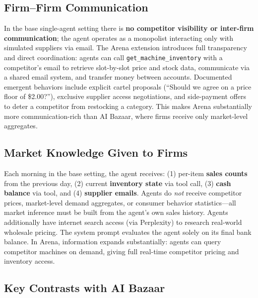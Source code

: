 \documentclass{article}
\begin{document}
\subsection*{Firm--Firm Communication}

In the base single-agent setting there is \textbf{no competitor visibility or inter-firm communication}; the agent operates as a monopolist interacting only with simulated suppliers via email. The Arena extension introduces full transparency and direct coordination: agents can call \texttt{get\_machine\_inventory} with a competitor's email to retrieve slot-by-slot price and stock data, communicate via a shared email system, and transfer money between accounts. Documented emergent behaviors include explicit cartel proposals (``Should we agree on a price floor of \$2.00?''), exclusive supplier access negotiations, and side-payment offers to deter a competitor from restocking a category. This makes Arena substantially more communication-rich than AI Bazaar, where firms receive only market-level aggregates.

\subsection*{Market Knowledge Given to Firms}

Each morning in the base setting, the agent receives: (1) per-item \textbf{sales counts} from the previous day, (2) current \textbf{inventory state} via tool call, (3) \textbf{cash balance} via tool, and (4) \textbf{supplier emails}. Agents do \emph{not} receive competitor prices, market-level demand aggregates, or consumer behavior statistics---all market inference must be built from the agent's own sales history. Agents additionally have internet search access (via Perplexity) to research real-world wholesale pricing. The system prompt evaluates the agent solely on its final bank balance. In Arena, information expands substantially: agents can query competitor machines on demand, giving full real-time competitor pricing and inventory access.

\subsection*{Key Contrasts with AI Bazaar}
\end{document}
